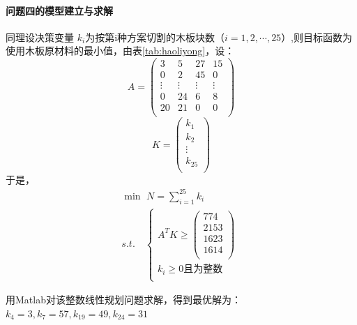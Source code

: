 \documentclass[hyperref,UTF8]{article}
\begin{document}
{\paragraph{问题四的模型建立与求解}
同理设决策变量 $k_i$为按第i种方案切割的木板块数（$i=1,2,\cdots,25$）,则目标函数为使用木板原材料的最小值，由表\ref{tab:haoliyong}，设：
\begin{equation}\label{shuju1}
  A=\left(
            \begin{array}{cccc}
              3 & 5 & 27 & 15 \\
              0 & 2 & 45 &0 \\
              \vdots & \vdots & \vdots &\vdots \\
              0 & 24 & 6 & 8 \\
              20 & 21 & 0 & 0 \\
            \end{array}
          \right)
\end{equation}
\begin{equation}\label{shuju2}
          K=\left(
              \begin{array}{c}
                k_1 \\
                k_2 \\
                \vdots \\
                k_{25} \\
              \end{array}
            \right)
\end{equation}
于是，
\begin{equation}\label{zuixiaozhi2}
  \begin{split}
&\min \,\, N=\sum_{i=1}^{25} k_i\\
&s.t.\quad  \left\{\begin{array}{c}
A^TK\geq \left(
           \begin{array}{c}
             774 \\
             2153 \\
             1623 \\
             1614 \\
           \end{array}
         \right)
\quad \\
k_i\geq0\mbox{且为整数}\quad \\
\end{array}\right.
\end{split}
\end{equation}\par
用Matlab对该整数线性规划问题求解，得到最优解为：$k_4=3,k_7=57,k_{19}=49,k_{24}=31$
}
\end{document}
